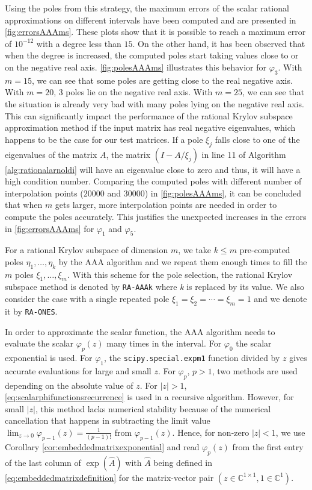 Using the poles from this strategy, the maximum errors of the scalar rational approximations on different
intervals have been computed and are presented in \autoref{fig:errorsAAAms}. These plots show that
it is possible to reach a maximum error of $10^{-12}$ with a degree less than $15$.
On the other hand, it has been observed that when the degree is increased, the computed poles
start taking values close to or on the negative real axis.
\autoref{fig:polesAAAms} illustrates this behavior for $\varphi_3$.
With $m=15$, we can see that some poles are getting close to the real negative axis. With $m=20$, 3 poles
lie on the negative real axis. With $m=25$, we can see that the situation is already very bad with many
poles lying on the negative real axis.
This can significantly impact the performance of the rational Krylov subspace approximation method if the input
matrix has real negative eigenvalues, which happens to be the case for our test matrices.
If a pole $\xi_j$ falls close to one of the eigenvalues of the matrix $A$,
the matrix $(I - A/\xi_j)$ in line 11 of Algorithm \ref{alg:rationalarnoldi} will have
an eigenvalue close to zero and thus, it will have a high condition number.
Comparing the computed poles with different number of interpolation points ($20000$ and $30000$)
in \autoref{fig:polesAAAms}, it can be concluded that when $m$ gets larger, more interpolation
points are needed in order to compute the poles accurately.
This justifies the unexpected increases in the errors in \autoref{fig:errorsAAAms}
for $\varphi_1$ and $\varphi_5$.

For a rational Krylov subspace of dimension $m$, we take $k \le m$ pre-computed poles $\eta_1, \dots, \eta_k$
by the AAA algorithm and we repeat them enough times to fill the $m$ poles $\xi_1, \dots, \xi_m$.
With this scheme for the pole selection, the rational Krylov subspace method is denoted by
\texttt{RA-AAAk} where \textit{k} is replaced by its value.
We also consider the case with a single repeated pole $\xi_1 = \xi_2 = \cdots = \xi_{m} = 1$ and
we denote it by \texttt{RA-ONES}.

\begin{remark}
    In order to approximate the scalar function, the AAA algorithm needs to evaluate the scalar
    $\varphi_p(z)$ many times in the interval.
    For $\varphi_0$ the scalar exponential is used. For $\varphi_1$, the \texttt{scipy.special.expm1}
    function divided by $z$ gives accurate evaluations for large and small $z$.
    For $\varphi_p$, $p > 1$, two methods are used depending on the absolute value of $z$.
    For $|z| > 1$, \eqref{eq:scalarphifunctionsrecurrence} is used in a recursive algorithm.
    However, for small $|z|$, this method lacks numerical stability because of the numerical
    cancellation that happens in subtracting the limit value
    $\lim_{z \to 0}\varphi_{p-1}(z) = \frac{1}{(p-1)!}$ from $\varphi_{p-1}(z)$.
    Hence, for non-zero $|z| < 1$, we use Corollary \ref{cor:embeddedmatrixexponential} and read $\varphi_p(z)$
    from the first entry of the last column of $\exp(\hat{A})$ with $\hat{A}$ being defined in
    \eqref{eq:embeddedmatrixdefinition} for the matrix-vector pair
    $(z \in \mathbb{C}^{1 \times 1}, 1 \in \mathbb{C}^{1})$.
\end{remark}

